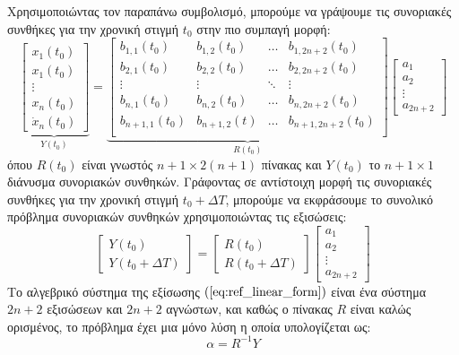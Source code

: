 Χρησιμοποιώντας τον παραπάνω συμβολισμό, μπορούμε να γράψουμε τις συνοριακές συνθήκες για την χρονική στιγμή $t_0$ στην πιο συμπαγή μορφή:
\begin{equation*}
	\underbrace{
	\begin{bmatrix} x_1(t_0) \\ x_1(t_0) \\ \vdots \\ x_n(t_0) \\ \dot{x}_n(t_0)
	\end{bmatrix}}_{Y(t_0)}
	= 
	\underbrace{
	\begin{bmatrix} 
	b_{1,1}(t_0)   & b_{1,2}(t_0)   & \dots  & b_{1,2n+2}(t_0)   \\
	b_{2,1}(t_0)   & b_{2,2}(t_0)   & \dots  & b_{2,2n+2}(t_0)   \\
	\vdots       & \vdots       & \ddots & \vdots          \\
	b_{n,1}(t_0)   & b_{n,2}(t_0)   & \dots  & b_{n,2n+2}(t_0)   \\
	b_{n+1,1}(t_0) & b_{n+1,2}(t) & \dots  & b_{n+1,2n+2}(t_0) \\
	\end{bmatrix}
	}_{R(t_0)}
	\begin{bmatrix} a_1 \\ a_2 \\ \vdots \\ a_{2n+2}
	\end{bmatrix}
\end{equation*}
όπου $R(t_0)$ είναι γνωστός $n+1 \times 2(n+1)$ πίνακας και $Y(t_0)$ το $n+1 \times 1$ διάνυσμα συνοριακών συνθηκών. Γράφοντας σε αντίστοιχη μορφή τις συνοριακές συνθήκες για την χρονική στιγμή $t_0+\Delta T$, μπορούμε να εκφράσουμε το συνολικό πρόβλημα συνοριακών συνθηκών χρησιμοποιώντας τις εξισώσεις:
\begin{equation}
	\begin{bmatrix} Y(t_0) \\ Y(t_0 + \Delta T)
	\end{bmatrix} = 
	\begin{bmatrix}
	R(t_0) \\ R(t_0+\Delta T)
	\end{bmatrix}  \begin{bmatrix} a_1 \\ a_2 \\ \vdots \\ a_{2n+2}
	\end{bmatrix}
	\label{eq:ref_linear_form}
\end{equation}
Το αλγεβρικό σύστημα της εξίσωσης $(\ref{eq:ref_linear_form})$ είναι ένα σύστημα $2n+2$ εξισώσεων και $2n+2$ αγνώστων, και καθώς ο πίνακας $R$ είναι καλώς ορισμένος, το πρόβλημα έχει μια μόνο λύση η οποία υπολογίζεται ως:
\begin{equation}
	\alpha = R^{-1} Y
	\label{eq:ref_system_inv_solution}
\end{equation}

